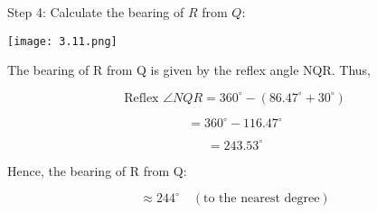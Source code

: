 \begin{flushleft}
	Step 4: Calculate the bearing of $R$ from $Q$:
	\\
	\begin{center}
		\texttt{[image: 3.11.png]}
	\end{center}
	The bearing of R from Q is given by the reflex angle NQR. Thus,
	
	\[
	\text{Reflex } \angle NQR = 360^\circ - (86.47^\circ + 30^\circ)
	\]
	
	\[
	= 360^\circ - 116.47^\circ
	\]
	
	\[
	= 243.53^\circ
	\]
	
	Hence, the bearing of R from Q:
	
	\[
	\approx 244^\circ \quad (\text{to the nearest degree})
	\]
	
	
\end{flushleft}


